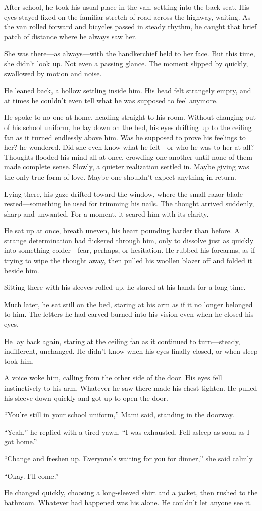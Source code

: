 After school, he took his usual place in the van, settling into the back seat. His eyes stayed fixed on the familiar stretch of road across the highway, waiting. As the van rolled forward and bicycles passed in steady rhythm, he caught that brief patch of distance where he always saw her.

She was there—as always—with the handkerchief held to her face. But this time, she didn't look up. Not even a passing glance. The moment slipped by quickly, swallowed by motion and noise.

He leaned back, a hollow settling inside him. His head felt strangely empty, and at times he couldn't even tell what he was supposed to feel anymore.

He spoke to no one at home, heading straight to his room. Without changing out of his school uniform, he lay down on the bed, his eyes drifting up to the ceiling fan as it turned endlessly above him. Was he supposed to prove his feelings to her? he wondered. Did she even know what he felt—or who he was to her at all? Thoughts flooded his mind all at once, crowding one another until none of them made complete sense. Slowly, a quieter realization settled in. Maybe giving was the only true form of love. Maybe one shouldn't expect anything in return.

Lying there, his gaze drifted toward the window, where the small razor blade rested—something he used for trimming his nails. The thought arrived suddenly, sharp and unwanted. For a moment, it scared him with its clarity.

He sat up at once, breath uneven, his heart pounding harder than before. A strange determination had flickered through him, only to dissolve just as quickly into something colder—fear, perhaps, or hesitation. He rubbed his forearms, as if trying to wipe the thought away, then pulled his woollen blazer off and folded it beside him.

Sitting there with his sleeves rolled up, he stared at his hands for a long time.

Much later, he sat still on the bed, staring at his arm as if it no longer belonged to him. The letters he had carved burned into his vision even when he closed his eyes.

He lay back again, staring at the ceiling fan as it continued to turn—steady, indifferent, unchanged. He didn't know when his eyes finally closed, or when sleep took him.

A voice woke him, calling from the other side of the door. His eyes fell instinctively to his arm. Whatever he saw there made his chest tighten. He pulled his sleeve down quickly and got up to open the door.

``You're still in your school uniform,'' Mami said, standing in the doorway.

``Yeah,'' he replied with a tired yawn. ``I was exhausted. Fell asleep as soon as I got home.''

``Change and freshen up. Everyone's waiting for you for dinner,'' she said calmly.

``Okay. I'll come.''

He changed quickly, choosing a long-sleeved shirt and a jacket, then rushed to the bathroom. Whatever had happened was his alone. He couldn't let anyone see it.